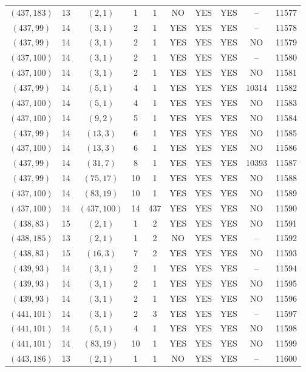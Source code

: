 \begin{longtable}{|c|c|c|c|c|c|c|c|c|c|}
$(437, 183)$ & 13 & $(2, 1)$ & 1 & 1 & NO & YES & YES & -- & 11577\\
$(437, 99)$ & 14 & $(3, 1)$ & 2 & 1 & YES & YES & YES & -- & 11578\\
$(437, 99)$ & 14 & $(3, 1)$ & 2 & 1 & YES & YES & YES & NO & 11579\\
$(437, 100)$ & 14 & $(3, 1)$ & 2 & 1 & YES & YES & YES & -- & 11580\\
$(437, 100)$ & 14 & $(3, 1)$ & 2 & 1 & YES & YES & YES & NO & 11581\\
$(437, 99)$ & 14 & $(5, 1)$ & 4 & 1 & YES & YES & YES & 10314 & 11582\\
$(437, 100)$ & 14 & $(5, 1)$ & 4 & 1 & YES & YES & YES & NO & 11583\\
$(437, 100)$ & 14 & $(9, 2)$ & 5 & 1 & YES & YES & YES & NO & 11584\\
$(437, 99)$ & 14 & $(13, 3)$ & 6 & 1 & YES & YES & YES & NO & 11585\\
$(437, 100)$ & 14 & $(13, 3)$ & 6 & 1 & YES & YES & YES & NO & 11586\\
$(437, 99)$ & 14 & $(31, 7)$ & 8 & 1 & YES & YES & YES & 10393 & 11587\\
$(437, 99)$ & 14 & $(75, 17)$ & 10 & 1 & YES & YES & YES & NO & 11588\\
$(437, 100)$ & 14 & $(83, 19)$ & 10 & 1 & YES & YES & YES & NO & 11589\\
$(437, 100)$ & 14 & $(437, 100)$ & 14 & 437 & YES & YES & YES & NO & 11590\\
$(438, 83)$ & 15 & $(2, 1)$ & 1 & 2 & YES & YES & YES & NO & 11591\\
$(438, 185)$ & 13 & $(2, 1)$ & 1 & 2 & NO & YES & YES & -- & 11592\\
$(438, 83)$ & 15 & $(16, 3)$ & 7 & 2 & YES & YES & YES & NO & 11593\\
$(439, 93)$ & 14 & $(3, 1)$ & 2 & 1 & YES & YES & YES & -- & 11594\\
$(439, 93)$ & 14 & $(3, 1)$ & 2 & 1 & YES & YES & YES & NO & 11595\\
$(439, 93)$ & 14 & $(3, 1)$ & 2 & 1 & YES & YES & YES & NO & 11596\\
$(441, 101)$ & 14 & $(3, 1)$ & 2 & 3 & YES & YES & YES & -- & 11597\\
$(441, 101)$ & 14 & $(5, 1)$ & 4 & 1 & YES & YES & YES & NO & 11598\\
$(441, 101)$ & 14 & $(83, 19)$ & 10 & 1 & YES & YES & YES & NO & 11599\\
$(443, 186)$ & 13 & $(2, 1)$ & 1 & 1 & NO & YES & YES & -- & 11600\\

\end{longtable}
